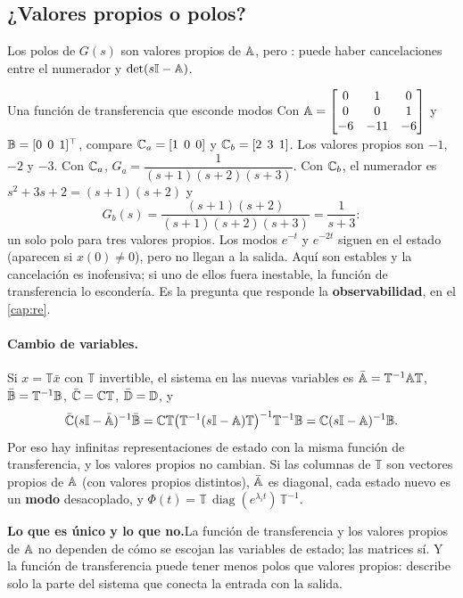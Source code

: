 \subsection{¿Valores propios o polos?}

Los polos de $G(s)$ son valores propios de $\mathbb{A}$, pero : puede haber cancelaciones entre el numerador y $\det(s\mathbb{I}-\mathbb{A})$.

\begin{ejemplo}[label=ej:ee-cancelacion]{Una función de transferencia que esconde modos}
Con $\mathbb{A}=\begin{bmatrix}0&1&0\\0&0&1\\-6&-11&-6\end{bmatrix}$ y $\mathbb{B}=[0\;\,0\;\,1]^\top$, compare $\mathbb{C}_a=[1\;\,0\;\,0]$ y $\mathbb{C}_b=[2\;\,3\;\,1]$.
\solucion Los valores propios son $-1$, $-2$ y $-3$. Con $\mathbb{C}_a$, $G_a=\dfrac{1}{(s+1)(s+2)(s+3)}$. Con $\mathbb{C}_b$, el numerador es $s^2+3s+2=(s+1)(s+2)$ y
\[
  G_b(s)=\frac{(s+1)(s+2)}{(s+1)(s+2)(s+3)}=\frac{1}{s+3}:
\]
un solo polo para tres valores propios. Los modos $e^{-t}$ y $e^{-2t}$ siguen en el estado (aparecen si $x(0)\neq0$), pero no llegan a la salida. Aquí son estables y la cancelación es inofensiva; si uno de ellos fuera inestable, la función de transferencia lo escondería. Es la pregunta que responde la \textbf{observabilidad}, en el \cref{cap:re}.
\end{ejemplo}


\paragraph{Cambio de variables.} Si $x=\mathbb T\bar x$ con $\mathbb T$ invertible, el sistema en las nuevas variables es $\bar{\mathbb{A}}=\mathbb T^{-1}\mathbb{A}\mathbb T$, $\bar{\mathbb{B}}=\mathbb T^{-1}\mathbb{B}$, $\bar{\mathbb{C}}=\mathbb{C}\mathbb T$, $\bar{\mathbb{D}}=\mathbb{D}$, y
\[
  \bar{\mathbb{C}}(s\mathbb{I}-\bar{\mathbb{A}})^{-1}\bar{\mathbb{B}}=\mathbb{C}\mathbb T\bigl(\mathbb T^{-1}(s\mathbb{I}-\mathbb{A})\mathbb T\bigr)^{-1}\mathbb T^{-1}\mathbb{B}=\mathbb{C}(s\mathbb{I}-\mathbb{A})^{-1}\mathbb{B} .
\]
Por eso hay infinitas representaciones de estado con la misma función de transferencia, y los valores propios no cambian. Si las columnas de $\mathbb T$ son vectores propios de $\mathbb{A}$ (con valores propios distintos), $\bar{\mathbb{A}}$ es diagonal, cada estado nuevo es un \textbf{modo} desacoplado, y $\Phi(t)=\mathbb T\,\operatorname{diag}(e^{\lambda_it})\,\mathbb T^{-1}$.


\begin{ideaclave}
\textbf{Lo que es único y lo que no.}\enspace La función de transferencia y los valores propios de $\mathbb{A}$ no dependen de cómo se escojan las variables de estado; las matrices sí. Y la función de transferencia puede tener menos polos que valores propios: describe solo la parte del sistema que conecta la entrada con la salida.
\end{ideaclave}
